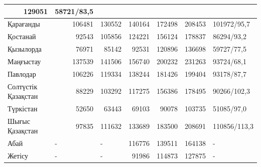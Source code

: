 \begin{table}[H]
{\begin{tabular}{|lrrrrrl|}
  \multicolumn{1}{r|}{129051} &
  58721/83,5 \\ \hline
\multicolumn{1}{|l|}{Қарағанды} &
  \multicolumn{1}{r|}{106481} &
  \multicolumn{1}{r|}{130552} &
  \multicolumn{1}{r|}{140164} &
  \multicolumn{1}{r|}{172498} &
  \multicolumn{1}{r|}{208453} &
  101972/95,7 \\ \hline
\multicolumn{1}{|l|}{Қостанай} &
  \multicolumn{1}{r|}{92543} &
  \multicolumn{1}{r|}{105856} &
  \multicolumn{1}{r|}{124221} &
  \multicolumn{1}{r|}{156124} &
  \multicolumn{1}{r|}{178837} &
  86294/93,2 \\ \hline
\multicolumn{1}{|l|}{Қызылорда} &
  \multicolumn{1}{r|}{76971} &
  \multicolumn{1}{r|}{85142} &
  \multicolumn{1}{r|}{92531} &
  \multicolumn{1}{r|}{120896} &
  \multicolumn{1}{r|}{136698} &
  59727/77,5 \\ \hline
\multicolumn{1}{|l|}{Маңғыстау} &
  \multicolumn{1}{r|}{137539} &
  \multicolumn{1}{r|}{141506} &
  \multicolumn{1}{r|}{156740} &
  \multicolumn{1}{r|}{200232} &
  \multicolumn{1}{r|}{231263} &
  93724/68,1 \\ \hline
\multicolumn{1}{|l|}{Павлодар} &
  \multicolumn{1}{r|}{106226} &
  \multicolumn{1}{r|}{119334} &
  \multicolumn{1}{r|}{138244} &
  \multicolumn{1}{r|}{181426} &
  \multicolumn{1}{r|}{199404} &
  93178/87,7 \\ \hline
\multicolumn{1}{|l|}{Солтүстік Қазақстан} &
  \multicolumn{1}{r|}{88229} &
  \multicolumn{1}{r|}{103292} &
  \multicolumn{1}{r|}{117275} &
  \multicolumn{1}{r|}{156386} &
  \multicolumn{1}{r|}{178495} &
  90266/102,3 \\ \hline
\multicolumn{1}{|l|}{Түркістан} &
  \multicolumn{1}{r|}{52650} &
  \multicolumn{1}{r|}{63443} &
  \multicolumn{1}{r|}{69103} &
  \multicolumn{1}{r|}{90078} &
  \multicolumn{1}{r|}{103735} &
  51085/97,0 \\ \hline
\multicolumn{1}{|l|}{Шығыс Қазақстан} &
  \multicolumn{1}{r|}{97835} &
  \multicolumn{1}{r|}{111632} &
  \multicolumn{1}{r|}{133689} &
  \multicolumn{1}{r|}{183500} &
  \multicolumn{1}{r|}{208691} &
  110856/113,3 \\ \hline
\multicolumn{1}{|l|}{Абай} &
  \multicolumn{1}{l|}{-} &
  \multicolumn{1}{l|}{-} &
  \multicolumn{1}{r|}{116776} &
  \multicolumn{1}{r|}{139511} &
  \multicolumn{1}{r|}{164138} &
  - \\ \hline
\multicolumn{1}{|l|}{Жетісу} &
  \multicolumn{1}{l|}{-} &
  \multicolumn{1}{l|}{-} &
  \multicolumn{1}{r|}{91986} &
  \multicolumn{1}{r|}{114873} &
  \multicolumn{1}{r|}{127875} &
  - \\ \hline

\end{tabular}}
\end{table}

